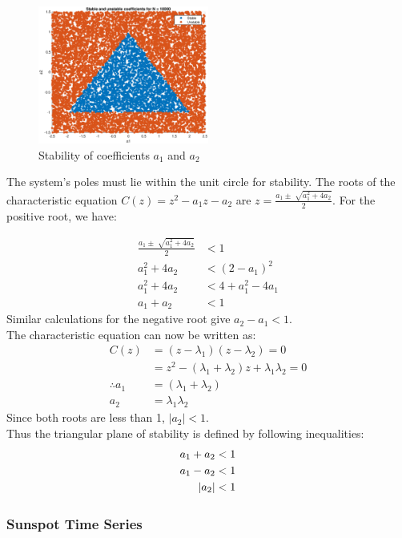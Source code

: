 \documentclass{article}
\begin{document}
\begin{figure}[h!]
\centering
\includegraphics[width=0.5\textwidth]{autoreg}
\caption{\label{fig:autoreg} Stability of coefficients $a_1$ and $a_2$}
\end{figure}

The system's poles must lie within the unit circle for stability. The roots of the characteristic equation $C(z)=z^2 -a_1 z - a_2$ are $z=\frac{a_1 \pm \sqrt[]{a_1^2 + 4a_2}}{2}$. For the positive root, we have:

\begin{align*}
\frac{a_1 \pm \sqrt[]{a_1^2 + 4a_2}}{2} &< 1\\
a_1^2 + 4a_2 &< (2-a_1)^2\\
a_1^2 + 4a_2 &< 4 + a_1^2 - 4a_1\\
a_1 + a_2 &< 1
\end{align*}
Similar calculations for the negative root give $a_2-a_1<1$.\\

The characteristic equation can now be written as:
\begin{align*}
C(z) &= (z-\lambda_1)(z-\lambda_2) = 0\\
&= z^2-(\lambda_1 + \lambda_2)z + \lambda_1\lambda_2=0\\
\therefore a_1 &= (\lambda_1 + \lambda_2)\\
a_2 &= \lambda_1\lambda_2
\end{align*}
Since both roots are less than 1, $|a_2|<1$.\\

Thus the triangular plane of stability is defined by following inequalities:
\begin{align}
\centering
a_1 + a_2 &< 1\\
a_1 - a_2 &< 1\\
|a_2|&<1
\end{align}

\pagebreak

\subsubsection{Sunspot Time Series}
\end{document}

